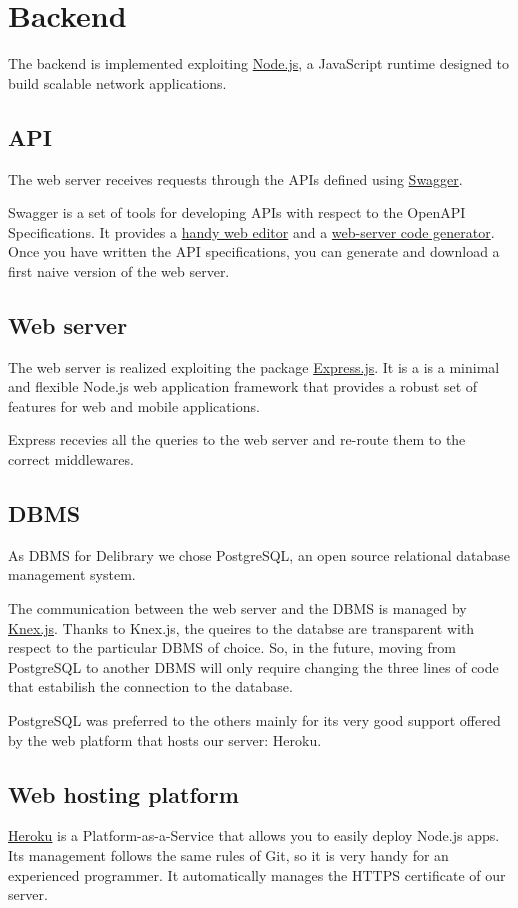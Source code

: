 \section{Backend}
The backend is implemented exploiting \href{https://nodejs.org}{Node.js}, a JavaScript runtime designed to build scalable network applications.

\subsection{API}
The web server receives requests through the APIs defined using \href{https://swagger.io}{Swagger}.

Swagger is a set of tools for developing APIs with respect to the OpenAPI Specifications.
It provides a \href{https://editor.swagger.io}{handy web editor} and a \href{https://swagger.io/tools/swagger-codegen}{web-server code generator}.
Once you have written the API specifications, you can generate and download a first naive version of the web server.

\subsection{Web server}
The web server is realized exploiting the package \href{https://expressjs.com}{Express.js}.
It is a is a minimal and flexible Node.js web application framework that provides a robust set of features for web and mobile applications.

Express recevies all the queries to the web server and re-route them to the correct middlewares.

\subsection{DBMS}
As DBMS for Delibrary we chose PostgreSQL, an open source relational database management system.

The communication between the web server and the DBMS is managed by \href{https://knexjs.org}{Knex.js}.
Thanks to Knex.js, the queires to the databse are transparent with respect to the particular DBMS of choice.
So, in the future, moving from PostgreSQL to another DBMS will only require changing the three lines of code that estabilish the connection to the database.

PostgreSQL was preferred to the others mainly for its very good support offered by the web platform that hosts our server: Heroku.

\subsection{Web hosting platform}
\href{https://www.heroku.com/home}{Heroku} is a Platform-as-a-Service that allows you to easily deploy Node.js apps.
Its management follows the same rules of Git, so it is very handy for an experienced programmer.
It automatically manages the HTTPS certificate of our server.

